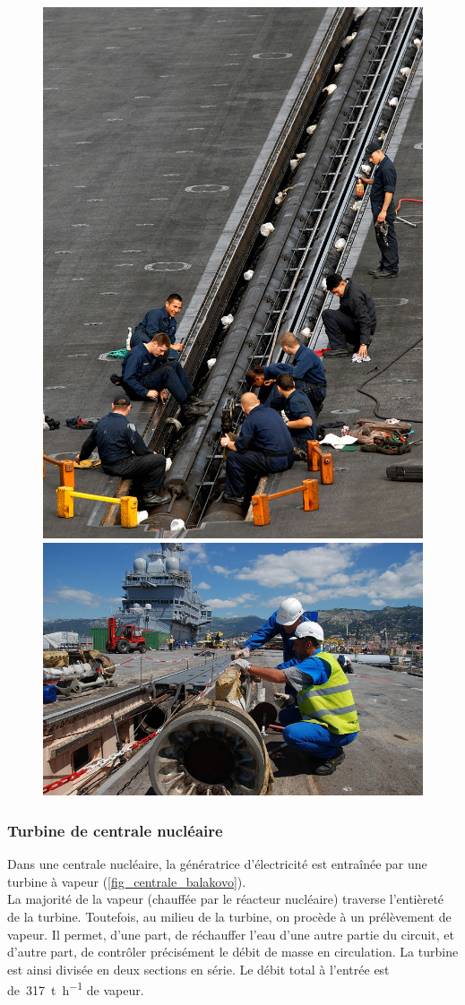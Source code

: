 	\begin{figure}
		\begin{center}
			\includegraphics[height=0.44\textwidth]{images/catapulte_vapeur_1.jpg}
			\includegraphics[height=0.44\textwidth]{images/catapulte_vapeur_2.jpg}
		\end{center}
		\label{fig_catapultes}
	\end{figure}

\subsubsection{Turbine de centrale nucléaire}

	Dans une centrale nucléaire, la génératrice d’électricité est entraînée par une turbine à vapeur (\cref{fig_centrale_balakovo}).\\
	La majorité de la vapeur (chauffée par le réacteur nucléaire) traverse l’entièreté de la turbine. Toutefois, au milieu de la turbine, on procède à un prélèvement de vapeur. Il permet, d’une part, de réchauffer l’eau d’une autre partie du circuit, et d’autre part, de contrôler précisément le débit de masse en circulation. La turbine est ainsi divisée en deux sections en série. Le débit total à l’entrée est de~\SI{317}{\tonne\per\hour} de vapeur.
	
